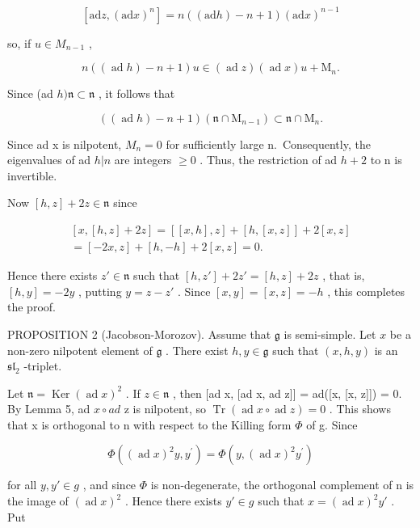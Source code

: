 \[
[ \mathrm{ad} z, (\mathrm{ad} x) ^ {n} ] = n ((\mathrm{ad} h) - n + 1) (\mathrm{ad} x) ^ {n - 1}
\]

so, if \(u \in M_{n-1}\) ,

\[
n ((\operatorname{ad} h) - n + 1) u \in (\operatorname{ad} z) (\operatorname{ad} x) u + \mathrm{M} _ {n}.
\]

Since (ad \(h)\mathfrak{n}\subset \mathfrak{n}\) , it follows that

\[
((\operatorname{ad} h) - n + 1) (\mathfrak {n} \cap \mathrm{M} _ {n - 1}) \subset \mathfrak {n} \cap \mathrm{M} _ {n}.
\]

Since ad x is nilpotent, \(M_{n} = 0\) for sufficiently large n.~Consequently, the eigenvalues of ad \(h|n\) are integers \(\geq 0\) . Thus, the restriction of ad \(h + 2\) to n is invertible.

Now \([h,z] + 2z\in \mathfrak{n}\) since

\[
\begin{array}{r} [ x, [ h, z ] + 2 z ] = [ [ x, h ], z ] + [ h, [ x, z ] ] + 2 [ x, z ] \\ = [ - 2 x, z ] + [ h, - h ] + 2 [ x, z ] = 0. \end{array}
\]

Hence there exists \(z' \in \mathfrak{n}\) such that \([h, z'] + 2z' = [h, z] + 2z\) , that is, \([h, y] = -2y\) , putting \(y = z - z'\) . Since \([x, y] = [x, z] = -h\) , this completes the proof.

PROPOSITION 2 (Jacobson-Morozov). Assume that \(\mathfrak{g}\) is semi-simple. Let \(x\) be a non-zero nilpotent element of \(\mathfrak{g}\) . There exist \(h, y \in \mathfrak{g}\) such that \((x, h, y)\) is an \(\mathfrak{sl}_2\) -triplet.

Let \(\mathfrak{n}=\operatorname{Ker}(\operatorname{ad}x)^{2}\) . If \(z\in\mathfrak{n}\) , then {[}ad x, {[}ad x, ad z{]}{]} = ad({[}x, {[}x, z{]}{]}) = 0. By Lemma 5, ad \(x\circ ad\) z is nilpotent, so \(\operatorname{Tr}(\operatorname{ad}x\circ\operatorname{ad}z)=0\) . This shows that x is orthogonal to n with respect to the Killing form \(\Phi\) of g. Since

\[
\Phi ((\operatorname{ad} x) ^ {2} y, y ^ {\prime}) = \Phi (y, (\operatorname{ad} x) ^ {2} y ^ {\prime})
\]

for all \(y, y' \in g\) , and since \(\Phi\) is non-degenerate, the orthogonal complement of n is the image of \((\operatorname{ad} x)^{2}\) . Hence there exists \(y' \in g\) such that \(x = (\operatorname{ad} x)^{2}y'\) . Put

